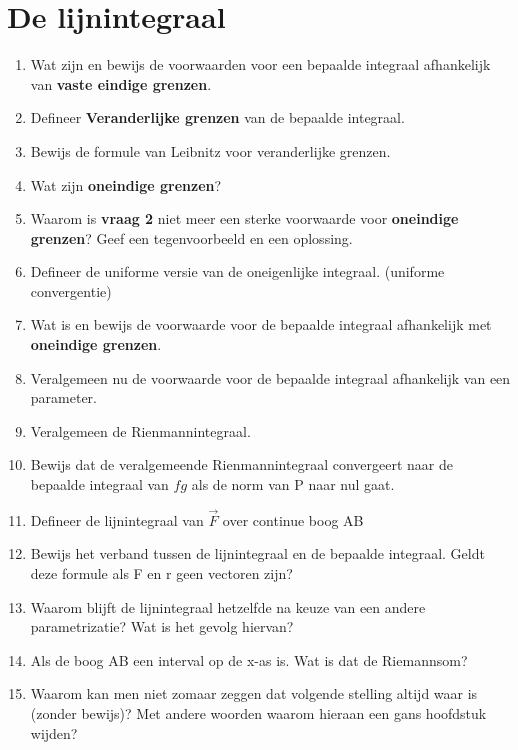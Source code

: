 \documentclass[a4paper,12pt]{article}
\begin{document}
    \maketitle


    \section{De lijnintegraal}
    \begin{enumerate}
        \item Wat zijn en bewijs de voorwaarden voor een bepaalde integraal afhankelijk van \textbf{vaste eindige grenzen}.
        \item Defineer \textbf{Veranderlijke grenzen} van de bepaalde integraal.
        \item Bewijs de formule van Leibnitz voor veranderlijke grenzen.
        \item Wat zijn \textbf{oneindige grenzen}?
        \item Waarom is \textbf{vraag 2} niet meer een sterke voorwaarde voor \textbf{oneindige grenzen}? Geef een tegenvoorbeeld en een oplossing.
        \item Defineer de uniforme versie van de oneigenlijke integraal. (uniforme convergentie)
        \item Wat is en bewijs de voorwaarde voor de bepaalde integraal afhankelijk met \textbf{oneindige grenzen}.
        \item Veralgemeen nu de voorwaarde voor de bepaalde integraal afhankelijk van een parameter.
        \item Veralgemeen de Rienmannintegraal.
        \item Bewijs dat de veralgemeende Rienmannintegraal convergeert naar de bepaalde integraal van $fg$ als de norm van P naar nul gaat.
        \item Defineer de lijnintegraal van $\vec{F}$ over continue boog AB
        \item Bewijs het verband tussen de lijnintegraal en de bepaalde integraal. Geldt deze formule als F en r geen vectoren zijn?
        \item Waarom blijft de lijnintegraal hetzelfde na keuze van een andere parametrizatie? Wat is het gevolg hiervan?
        \item Als de boog AB een interval op de x-as is. Wat is dat de Riemannsom?
        \item Waarom kan men niet zomaar zeggen dat volgende stelling altijd waar is (zonder bewijs)? Met andere woorden waarom hieraan een gans hoofdstuk wijden?

\end{enumerate}
\end{document}
